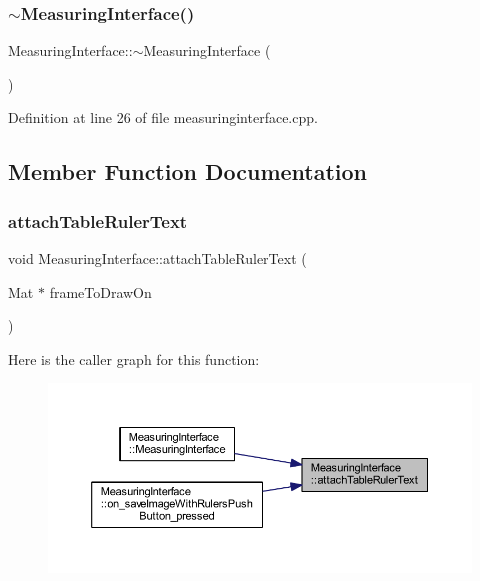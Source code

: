 \subsubsection{\texorpdfstring{$\sim$MeasuringInterface()}{~MeasuringInterface()}}
{\footnotesize\ttfamily Measuring\+Interface\+::$\sim$\+Measuring\+Interface (\begin{DoxyParamCaption}{ }\end{DoxyParamCaption})}



Definition at line 26 of file measuringinterface.\+cpp.



\subsection{Member Function Documentation}
\mbox{\label{classMeasuringInterface_a7a0020d816d48433a2f5035d72b47c68}} 
\subsubsection{\texorpdfstring{attachTableRulerText}{attachTableRulerText}}
{\footnotesize\ttfamily void Measuring\+Interface\+::attach\+Table\+Ruler\+Text (\begin{DoxyParamCaption}\item[{Mat $\ast$}]{frame\+To\+Draw\+On }\end{DoxyParamCaption})\hspace{0.3cm}{\ttfamily [signal]}}

Here is the caller graph for this function\+:
\nopagebreak
\begin{figure}[H]
\begin{center}
\leavevmode
\includegraphics[width=350pt]{classMeasuringInterface_a7a0020d816d48433a2f5035d72b47c68_icgraph}
\end{center}
\end{figure}
\mbox{\label{classMeasuringInterface_a62ef5d03298c79e95511272a0c113ab8}} 
